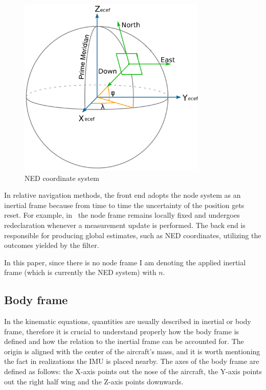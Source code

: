\begin{figure}[!ht]
    \centering
    \includegraphics[width=0.8\textwidth]{figures/NED.png}
    \caption{NED coordinate system~\cite{gps_navigation_slide}}\label{fig:NED}
\end{figure}

In relative navigation methods, the front end adopts the node system as an inertial frame because from time to time the uncertainty of the position gets reset. For example, in~\cite{rel-nav} the node frame remains locally fixed and undergoes redeclaration whenever a measurement update is performed. The back end is responsible for producing global estimates, such as NED coordinates, utilizing the outcomes yielded by the filter.

In this paper, since there is no node frame I am denoting the applied inertial frame (which is currently the NED system) with $n$.

\subsection{Body frame}

In the kinematic equations, quantities are usually described in inertial or body frame, therefore it is crucial to understand properly how the body frame is defined and how the relation to the inertial frame can be accounted for. The origin is aligned with the center of the aircraft's mass, and it is worth mentioning the fact in realizations the IMU is placed nearby. The axes of the body frame are defined as follows: the X-axis points out the nose of the aircraft, the Y-axis points out the right half wing and the Z-axis points downwards.

